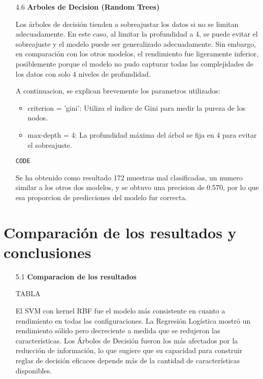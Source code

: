 \documentclass{article}
\begin{document}
\begin{itemize}

\item[4.6]  {\bf Arboles de Decision (Random Trees)}

Los árboles de decisión tienden a sobreajustar los datos si no se limitan adecuadamente. En este caso, al limitar la profundidad a 4, se puede evitar el sobreajuste y el modelo puede ser generalizado adecuadamente. Sin embargo, en comparación con los otros modelos, el rendimiento fue ligeramente inferior, posiblemente porque el modelo no pudo capturar todas las complejidades de los datos con solo 4 niveles de profundidad.

A continuacion, se explican brevemente los parametros utilizados:

\begin{itemize}

\item
criterion = 'gini': Utiliza el índice de Gini para medir la pureza de los nodos.

\item
max-depth = 4: La profundidad máxima del árbol se fija en 4 para evitar el sobreajuste.

\end{itemize}

\begin{tcolorbox}[width=14cm]
\begin{scriptsize}
\begin{verbatim}
CODE
\end{verbatim}
\end{scriptsize}
\end{tcolorbox}

Se ha obtenido como resultado 172 muestras mal clasificadas, un numero similar a los otros dos modelos, y se obtuvo una precision de 0.570, por lo que esa proporcion de  predicciones del modelo fur correcta.

\end{itemize}


\newpage

\section[5]{Comparaci\'on de los resultados y conclusiones}

\begin{itemize}

\item[5.1]  {\bf Comparacion de los resultados}

TABLA

El SVM con kernel RBF fue el modelo más consistente en cuanto a rendimiento en todas las configuraciones. La Regresión Logística mostró un rendimiento sólido pero decreciente a medida que se redujeron las características. Los Árboles de Decisión fueron los más afectados por la reducción de información, lo que sugiere que su capacidad para construir reglas de decisión eficaces depende más de la cantidad de características disponibles.

\end{itemize}
\end{document}
